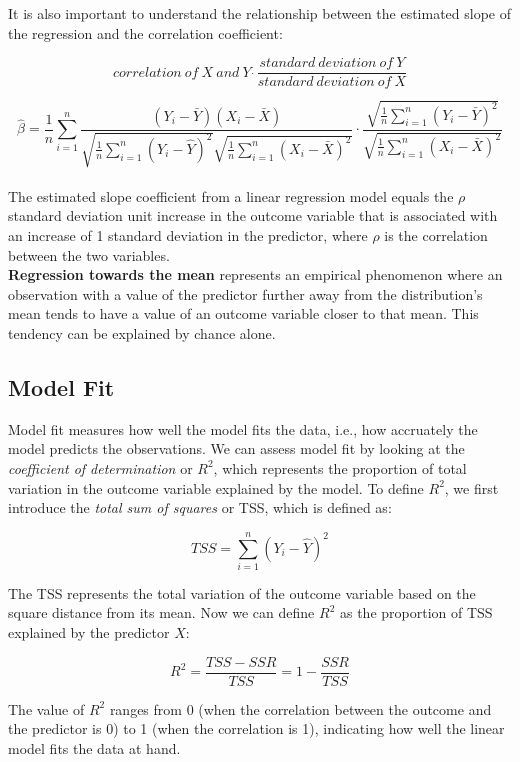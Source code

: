 \documentclass{article}
\begin{document}
    It is also important to understand the relationship between the
    estimated slope of the regression and the correlation coefficient:

    \[
        correlation \ of \ X \ and \ Y \ \dot \ \frac{standard \ deviation \ of \ Y}{standard \ deviation \ of \ X}
    \]

    \[
        \hat{\beta} = \frac{1}{n}\sum^{n}_{i=1}\frac{(Y_i - \bar{Y})(X_i - \bar{X})}{\sqrt{\frac{1}{n}\sum^{n}_{i=1}(Y_i-\hat{Y})^2}\sqrt{\frac{1}{n}\sum^{n}_{i=1}(X_i-\bar{X})^2}} \cdot \frac{\sqrt{\frac{1}{n}\sum^{n}_{i=1}(Y_i - \bar{Y})^2}}{\sqrt{\frac{1}{n}\sum^{n}_{i=1}(X_i-\bar{X})^2}}
    \]\\

    \noindent The estimated slope coefficient from a linear regression model
equals the $\rho$ standard deviation unit increase in the outcome variable
that is associated with an increase of 1 standard deviation in the
predictor, where $\rho$ is the correlation between the two variables.\\

    \noindent \textbf{Regression towards the mean} represents an empirical
phenomenon where an observation with a value of the predictor further away
from the distribution's mean tends to have a value of an outcome variable
closer to that mean. This tendency can be explained by chance alone.

    \subsection{Model Fit}

    \noindent Model fit measures how well the model fits the data, i.e., how
accruately the model predicts the observations. We can assess model fit by
looking at the \textit{coefficient of determination} or $R^2$, which
represents the proportion of total variation in the outcome variable
explained by the model. To define $R^2$, we first introduce the
\textit{total sum of squares} or TSS, which is defined as:

    \[
        TSS = \sum^{n}_{i=1}(Y_i - \hat{Y})^2
    \]

    The TSS represents the total variation of the outcome variable based on
    the square distance from its mean. Now we can define $R^2$ as the
proportion of TSS explained by the predictor $X$:

    \[
        R^2 = \frac{TSS - SSR}{TSS} = 1 - \frac{SSR}{TSS}
    \]

    The value of $R^2$ ranges from 0 (when the correlation between the
outcome and the predictor is 0) to 1 (when the correlation is 1), indicating
how well the linear model fits the data at hand.
\end{document}
